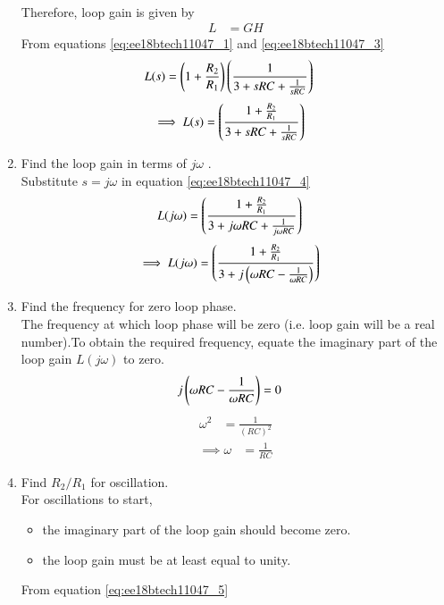\begin{enumerate}[label=\thesection.\arabic*.,ref=\thesection.\theenumi]
\begin{align}
\end{align}
Therefore, loop gain is given by 
\begin{align}
L &= GH
\end{align}
From equations \eqref{eq:ee18btech11047_1} and \eqref{eq:ee18btech11047_3}
\begin{align}
L(s) &= \left(1 + \frac{R_{2}}{R_{1}}\right)\left(\frac{1}{3+sRC+\frac{1}{sRC}}\right)
\end{align}
\begin{align}
\label{eq:ee18btech11047_4}
\implies L(s) &= \brak{\frac{1+\frac{R_{2}}{R_{1}}}{3+sRC+\frac{1}{sRC}}}
\end{align}
%
\item Find the loop gain in terms of $j\omega$ .\\
\solution Substitute $s = j\omega$ in equation \eqref{eq:ee18btech11047_4}
\begin{align} 
L(j\omega)&= \left(\frac{1+\frac{R_{2}}{R_{1}}}{3+j\omega RC+\frac{1}{j\omega RC}}\right)
\end{align}
\begin{align}
\label{eq:ee18btech11047_5}
\implies L(j\omega)&= \brak{\frac{1+\frac{R_{2}}{R_{1}}}{3+ j \brak{\omega RC-\frac{1}{\omega RC}}}}
\end{align}
\item Find the frequency for zero loop phase.\\
\solution The frequency at which loop phase will be zero (i.e. loop gain will be a real number).To obtain the required frequency, equate the imaginary part of the loop gain $L(j \omega )$ to zero.
\begin{align}
j\left(\omega RC - \frac{1}{\omega RC}\right) &= 0
\end{align}
\begin{align}
\omega^{2} &= \frac{1}{(RC)^{2}}
\end{align}
\begin{align}
\label{eq:ee18btech11047_freq}
\implies \omega &= \frac{1}{RC}
\end{align}
%
\item Find $R_{2}/R_{1}$ for oscillation.\\
\solution For oscillations to start, 
\begin{itemize}
    \item the imaginary part of the loop gain should become zero.
    \item the loop gain must be at least equal to unity.
\end{itemize}
From equation \eqref{eq:ee18btech11047_5} 

\end{enumerate}
